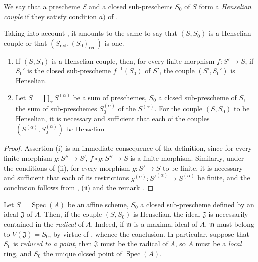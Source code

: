 \begin{definition}[18.5.5]
\label{IV.18.5.5}
We say that a prescheme $S$ and a closed sub-prescheme $S_0$ of $S$ form a \emph{Henselian couple} if they satisfy condition $a)$ of .
\end{definition}

Taking into account , it amounts to the same to say that $(S,S_0)$ is a Henselian couple or that $(S_{\mathrm{red}},(S_0)_{\mathrm{red}})$ is one.

\begin{proposition}[18.5.6]
\label{IV.18.5.6}
\begin{enumerate}
  \item[(i)] If $(S,S_0)$ is a Henselian couple, then, for every finite morphism $f:S'\to S$, if $S_0'$ is the closed sub-prescheme $f^{-1}(S_0)$ of $S'$, the couple $(S',S_0')$ is Henselian.
  \item[(ii)] Let $S=\coprod_\alpha S^{(\alpha)}$ be a sum of preschemes, $S_0$ a closed sub-prescheme of $S$, the sum of sub-preschemes $S_0^{(\alpha)}$ of the $S^{(\alpha)}$.
For the couple $(S,S_0)$ to be Henselian, it is necessary and sufficient that each of the couples $(S^{(\alpha)},S_0^{(\alpha)})$ be Henselian.
\end{enumerate}
\end{proposition}

\begin{proof}
Assertion (i) is an immediate consequence of the definition, since for every finite morphism $g:S''\to S'$, $f\circ g:S''\to S$ is a finite morphism.
Similarly, under the conditions of (ii), for every morphism $g:S'\to S$ to be finite, it is necessary and sufficient that each of its restrictions $g^{(\alpha)}:S'^{(\alpha)}\to S^{(\alpha)}$ be finite, and the conclusion follows from , (ii) and the remark .
\end{proof}

\begin{remark}[18.5.7]
\label{IV.18.5.7}
Let $S=\operatorname{Spec}(A)$ be an affine scheme, $S_0$ a closed sub-prescheme defined by an ideal $\mathfrak{J}$ of $A$.
Then, if the couple $(S,S_0)$ is Henselian, the ideal $\mathfrak{J}$ is necessarily contained in the \emph{radical} of $A$.
Indeed, if $\mathfrak{m}$ is a maximal ideal of $A$, $\mathfrak{m}$ must belong to $V(\mathfrak{J})=S_0$, by virtue of , whence the conclusion.
In particular, suppose that $S_0$ is \emph{reduced to a point}, then $\mathfrak{J}$ must be the radical of $A$, so $A$ must be a \emph{local} ring, and $S_0$ the unique closed point of $\operatorname{Spec}(A)$.
\end{remark}

